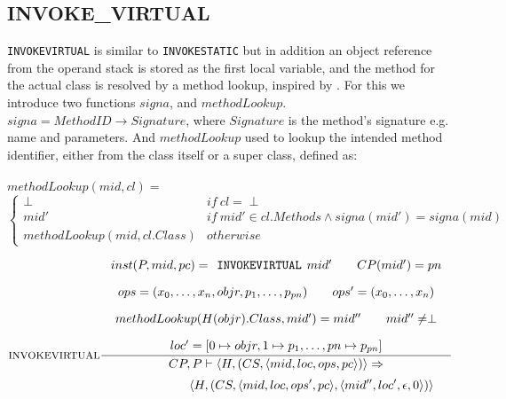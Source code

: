 \subsection{INVOKE\_VIRTUAL}
\texttt{INVOKEVIRTUAL} is similar to \texttt{INVOKESTATIC} but in addition an object reference from the operand stack is stored as the first local variable, and the method for the actual class is resolved by a method lookup, inspired by \cite{dalvik}. For this we introduce two functions $signa$, and $methodLookup$. $signa = MethodID \to Signature$, where $Signature$ is the method's signature e.g. name and parameters. And $methodLookup$ used to lookup the intended method identifier, either from the class itself or a super class, defined as: \\\\
$methodLookup(mid, cl) = $ \vspace{-10px}
\[
\begin{cases}
  \perp & if\ cl = \perp \\
  mid'  & if\ mid' \in cl.Methods \wedge signa(mid') = signa (mid)  \\
  methodLookup(mid, cl.Class) & otherwise
\end{cases}
\]


$$\inference[INVOKEVIRTUAL]{
inst(P,mid,pc) = \texttt{INVOKEVIRTUAL }mid' \semsp 
CP(mid') = pn \semnl \\
ops = (x_0, \ldots, x_n, objr, p_1, \ldots, p_{pn}) \semsp
ops' = (x_0, \ldots, x_{n}) \semnl\\ 
methodLookup(H(objr).Class, mid') = mid'' \semsp
mid'' \neq \perp \semnl\\
loc' = [0 \mapsto objr, 1 \mapsto p_{1}, \ldots, pn \mapsto p_{pn}]
}
{CP, P \vdash \langle H, (CS, \langle mid, loc, ops, pc \rangle)\rangle \Rightarrow }$$
$$\hspace{130px}\langle H, (CS, \langle mid, loc, ops', pc \rangle, \langle mid'', loc', \epsilon, 0 \rangle)\rangle$$
